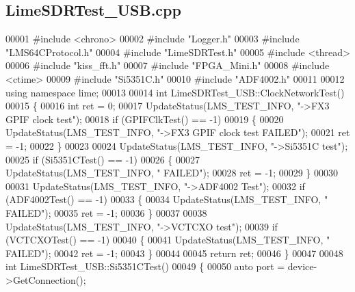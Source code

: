 \subsection{Lime\+S\+D\+R\+Test\+\_\+\+U\+S\+B.\+cpp}
\label{LimeSDRTest__USB_8cpp_source}

\begin{DoxyCode}
00001 \textcolor{preprocessor}{#include <chrono>}
00002 \textcolor{preprocessor}{#include "Logger.h"}
00003 \textcolor{preprocessor}{#include "LMS64CProtocol.h"}
00004 \textcolor{preprocessor}{#include "LimeSDRTest.h"}
00005 \textcolor{preprocessor}{#include <thread>}
00006 \textcolor{preprocessor}{#include "kiss_fft.h"}
00007 \textcolor{preprocessor}{#include "FPGA_Mini.h"}
00008 \textcolor{preprocessor}{#include <ctime>}
00009 \textcolor{preprocessor}{#include "Si5351C.h"}
00010 \textcolor{preprocessor}{#include "ADF4002.h"}
00011 
00012 \textcolor{keyword}{using namespace }lime;
00013 
00014 \textcolor{keywordtype}{int} LimeSDRTest_USB::ClockNetworkTest()
00015 \{
00016     \textcolor{keywordtype}{int} ret = 0;
00017     UpdateStatus(LMS_TEST_INFO, \textcolor{stringliteral}{"->FX3 GPIF clock test"});
00018     \textcolor{keywordflow}{if} (GPIFClkTest() == -1)
00019     \{
00020         UpdateStatus(LMS_TEST_INFO, \textcolor{stringliteral}{"->FX3 GPIF clock test FAILED"});
00021         ret = -1;
00022     \}
00023 
00024     UpdateStatus(LMS_TEST_INFO, \textcolor{stringliteral}{"->Si5351C test"});
00025     \textcolor{keywordflow}{if} (Si5351CTest() == -1)
00026     \{
00027         UpdateStatus(LMS_TEST_INFO, \textcolor{stringliteral}{"  FAILED"});
00028         ret = -1;
00029     \}
00030     
00031     UpdateStatus(LMS_TEST_INFO, \textcolor{stringliteral}{"->ADF4002 Test"});
00032     \textcolor{keywordflow}{if} (ADF4002Test() == -1)
00033     \{
00034         UpdateStatus(LMS_TEST_INFO, \textcolor{stringliteral}{"  FAILED"});
00035         ret = -1;
00036     \}
00037 
00038     UpdateStatus(LMS_TEST_INFO, \textcolor{stringliteral}{"->VCTCXO test"});
00039     \textcolor{keywordflow}{if} (VCTCXOTest() == -1)
00040     \{
00041         UpdateStatus(LMS_TEST_INFO, \textcolor{stringliteral}{"  FAILED"});
00042         ret = -1;
00043     \}
00044 
00045     \textcolor{keywordflow}{return} ret;
00046 \}
00047 
00048 \textcolor{keywordtype}{int} LimeSDRTest_USB::Si5351CTest()
00049 \{
00050     \textcolor{keyword}{auto} port = device->GetConnection();

\end{DoxyCode}
